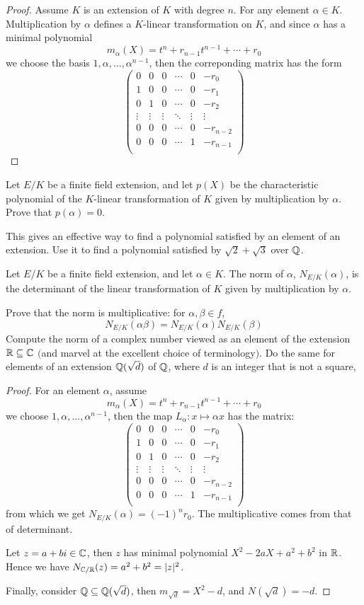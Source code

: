 \begin{proof}
Assume $K$ is an extension of $K$ with degree $n$. For any element $\alpha\in K$. Multiplication by $\alpha$ defines a $K$-linear transformation on $K$, and since $\alpha$ has a minimal polynomial 
\[m_\alpha(X)=t^n+r_{n-1}t^{n-1}+\cdots+r_0\] 
we choose the basis $1,\alpha,\dots,\alpha^{n-1}$, then the correponding matrix has the form
\[\begin{pmatrix}
0&0&0&\cdots&0&-r_0\\
1&0&0&\cdots&0&-r_1\\
0&1&0&\cdots&0&-r_2\\
\vdots&\vdots&\vdots&\ddots&\vdots&\vdots\\
0&0&0&\cdots&0&-r_{n-2}\\
0&0&0&\cdots&1&-r_{n-1}\\
\end{pmatrix}\]
\end{proof}
\begin{exercise}
Let $E/K$ be a finite field extension, and let $p(X)$ be the characteristic polynomial of the $K$-linear transformation of $K$ given by multiplication by $\alpha$. Prove that $p(\alpha)=0$.\par
This gives an effective way to find a polynomial satisfied by an element of an extension. Use it to find a polynomial satisfied by $\sqrt{2}+\sqrt{3}$ over $\mathbb{Q}$.
\end{exercise}
\begin{exercise}
Let $E/K$ be a finite field extension, and let $\alpha\in K$. The norm of $\alpha$, $N_{E/K}(\alpha)$, is the determinant of the linear transformation of $K$ given by multiplication by $\alpha$.\par
Prove that the norm is multiplicative: for $\alpha,\beta\in f$,
\[N_{E/K}(\alpha\beta)=N_{E/K}(\alpha)N_{E/K}(\beta)\]
Compute the norm of a complex number viewed as an element of the extension $\mathbb{R}\subseteq\mathbb{C}$ $($and marvel at the excellent choice of terminology$)$. Do the same for elements of an extension $\mathbb{Q}(\sqrt{d})$ of $\mathbb{Q}$, where $d$ is an integer that is not a square,
\end{exercise}
\begin{proof}
For an element $\alpha$, assume
\[m_\alpha(X)=t^n+r_{n-1}t^{n-1}+\cdots+r_0\]
we choose $1,\alpha,\dots,\alpha^{n-1}$, then the map $L_\alpha:x\mapsto \alpha x$ has the matrix:
\[\begin{pmatrix}
0&0&0&\cdots&0&-r_0\\
1&0&0&\cdots&0&-r_1\\
0&1&0&\cdots&0&-r_2\\
\vdots&\vdots&\vdots&\ddots&\vdots&\vdots\\
0&0&0&\cdots&0&-r_{n-2}\\
0&0&0&\cdots&1&-r_{n-1}\\
\end{pmatrix}\]
from which we get $N_{E/K}(\alpha)=(-1)^{n}r_0$. The multiplicative comes from that of determinant.\par
Let $z=a+bi\in\mathbb{C}$, then $z$ has minimal polynomial $X^2-2aX+a^2+b^2$ in $\mathbb{R}$. Hence we have $N_{\mathbb{C}/\mathbb{R}}(z)=a^2+b^2=|z|^2$.\par
Finally, consider $\mathbb{Q}\subseteq\mathbb{Q}(\sqrt{d})$, then $m_{\sqrt{d}}=X^2-d$, and $N(\sqrt{d})=-d$.
\end{proof}

